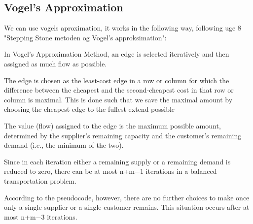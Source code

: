 \subsection{Vogel's Approximation}
We can use vogels aproximation, it works in the following way, following uge 8 "Stepping Stone metoden og Vogel’s approksimation":

In Vogel’s Approximation Method, an edge is selected iteratively and then assigned as much flow as possible.

The edge is chosen as the least-cost edge in a row or column for which the difference between the cheapest and the second-cheapest cost in that row or column is maximal. This is done such that we save the maximal amount by choosing the cheapest edge to the fullest extend possible

The value (flow) assigned to the edge is the maximum possible amount, determined by the supplier’s remaining capacity and the customer’s remaining demand (i.e., the minimum of the two).

Since in each iteration either a remaining supply or a remaining demand is reduced to zero, there can be at most n+m−1 iterations in a balanced transportation problem.

According to the pseudocode, however, there are no further choices to make once only a single supplier or a single customer remains. This situation occurs after at most n+m−3 iterations.